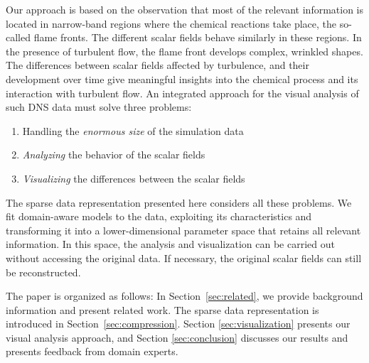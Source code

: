 Our approach is based on the observation that most of the relevant information
is located in narrow-band regions where the chemical reactions take place, the
so-called flame fronts. The different scalar fields behave similarly in these
regions. In the presence of turbulent flow, the flame front develops complex,
wrinkled shapes. The differences between scalar fields affected by turbulence,
and their development over time give meaningful insights into the chemical
process and its interaction with turbulent flow. An integrated approach for the
visual analysis of such \ac{DNS} data must solve three problems:
\begin{enumerate}
	\item \label{i:size} Handling the \emph{enormous size} of the simulation data
	\item \label{i:analyze} \emph{Analyzing} the behavior of the scalar fields
	\item \label{i:visualize} \emph{Visualizing} the differences between the scalar fields
\end{enumerate}
%
%
The sparse data representation presented here considers all these problems. We
fit domain-aware models to the data, exploiting its characteristics and
transforming it into a lower-dimensional parameter space that retains all
relevant information. In this space, the analysis and visualization can be
carried out without accessing the original data. If necessary, the original
scalar fields can still be reconstructed.

The paper is organized as follows: In Section~\ref{sec:related}, we provide
background information and present related work. The sparse data representation
is introduced in Section~\ref{sec:compression}. Section \ref{sec:visualization}
presents our visual analysis approach, and Section \ref{sec:conclusion}
discusses our results and presents feedback from domain experts.
